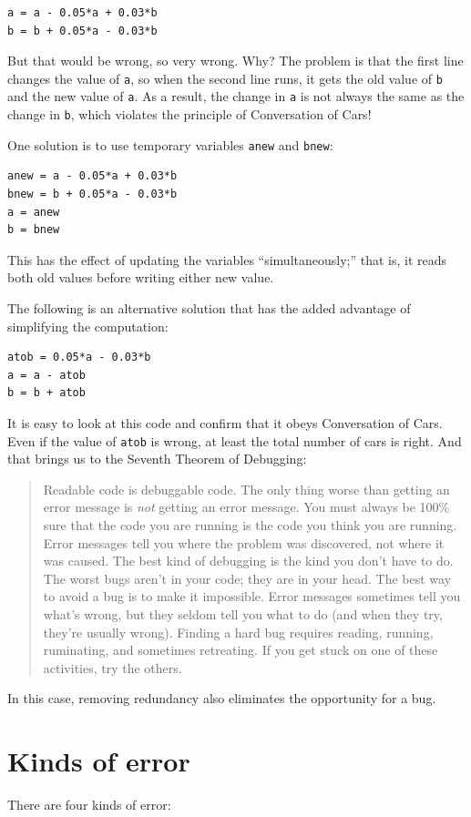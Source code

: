 \documentclass{book}
\newcommand{\displaythrm}[1]{%
    \ifthenelse{\equal{#1}{1}}%
        {Readable code is debuggable code.}{%
    \ifthenelse{\equal{#1}{2}}%
        {The only thing worse than getting an error message is {\em
         not} getting an error message.}{%
    \ifthenelse{\equal{#1}{3}}%
        {You must always be 100\% sure that the code you are running
         is the code you think you are running.}{%
    \ifthenelse{\equal{#1}{4}}%
        {Error messages tell you where the problem was discovered,
         not where it was caused.}{%
    \ifthenelse{\equal{#1}{5}}%
        {The best kind of debugging is the kind you don't have to do.}{%
    \ifthenelse{\equal{#1}{6}}%
        {The worst bugs aren't in your code; they are in your head.}{%
    \ifthenelse{\equal{#1}{7}}%
        {The best way to avoid a bug is to make it impossible.}{%
    \ifthenelse{\equal{#1}{8}}%
        {Error messages sometimes tell you what's wrong, but they
         seldom tell you what to do (and when they try, they're usually
         wrong).}{%
    \ifthenelse{\equal{#1}{9}}%
        {Finding a hard bug requires reading, running, ruminating,
         and sometimes retreating.  If you get stuck on one of these
         activities, try the others.}{%
    {}%
}}}}}}}}}}%
\begin{document}
\begin{verbatim}
a = a - 0.05*a + 0.03*b
b = b + 0.05*a - 0.03*b
\end{verbatim}

But that would be wrong, so very wrong.  Why?  The problem is that
the first line changes the value of {\tt a}, so when the second line
runs, it gets the old value of {\tt b} and the new value of {\tt a}.
As a result, the change in {\tt a} is not always the same as the
change in {\tt b}, which violates the principle of Conversation
of Cars!

One solution is to use temporary variables {\tt anew} and {\tt bnew}:

\begin{verbatim}
anew = a - 0.05*a + 0.03*b
bnew = b + 0.05*a - 0.03*b
a = anew
b = bnew
\end{verbatim}

This has the effect of updating the variables ``simultaneously;'' that
is, it reads both old values before writing either new value.

The following is an alternative solution that
has the added advantage of simplifying the computation:

\begin{verbatim}
atob = 0.05*a - 0.03*b
a = a - atob
b = b + atob
\end{verbatim}

It is easy to look at this code and confirm that it obeys Conversation
of Cars.  Even if the value of {\tt atob} is wrong, at least the total
number of cars is right.  And that brings us to the Seventh Theorem of
Debugging:

\begin{quote}
\displaythrm{7}
\end{quote}

In this case, removing redundancy also eliminates the opportunity for
a bug.


\section{Kinds of error}

There are four kinds of error:
\end{document}
